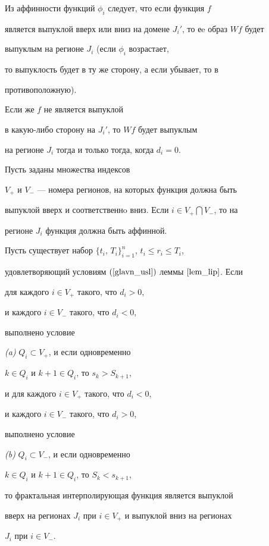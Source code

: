 Из аффинности функций $\phi_i$ следует, что если функция $f$


является выпуклой вверх или вниз на домене $J_i'$, то еe образ $W f$ будет


выпуклым на регионе $ J_i $ (если $\phi_i$ возрастает,


то выпуклость будет в ту же сторону, а если убывает, то в


противоположную).


Если же $ f $ не является выпуклой


в какую-либо сторону на $J_i'$, то $ W f $ будет выпуклым


на регионе $J_i$ тогда и только тогда, когда $d_i = 0$.





Пусть заданы множества индексов


$V_{+} $ и $V_{-}$ --- номера регионов, на которых функция должна быть


выпуклой вверх и соответственнo вниз. Если $i \in V_+ \bigcap V_- $, то на


регионе $ J_i $ функция должна быть аффинной.





\begin{lem} \label{convex}


Пусть существует набор $\{ t_i,\,T_i \}_{i=1}^n$, $ t_i \le r_i \le T_i $,


удовлетворяющий условиям $(\ref{glavn_usl})$ леммы $\ref{lem_lip}$. Если


для каждого $ i \in V_+$ такого, что $ d_i>0$,


и каждого $ i \in V_-$ такого, что $ d_i<0 $,


выполнено условие





{\em (a)} $ Q_i \subset V_+$, и если одновременно


$k \in Q_i$ и $k+1 \in Q_i$, то $s_k > S_{k+1}$,





\noindent{}и для каждого $ i \in V_+$ такого, что $ d_i<0 $,


и каждого $ i \in V_-$ такого, что $ d_i>0 $,


выполнено условие





{\em (b)} $ Q_i \subset V_-$, и если одновременно


$k \in Q_i$ и $k+1 \in Q_i$, то $S_k < s_{k+1}$,





\noindent{}то фрактальная интерполирующая функция является выпуклой


вверх на регионах $J_i$ при $ i \in V_+$ и выпуклой вниз на регионах


$J_i$ при $ i \in V_-$.


\end{lem}





